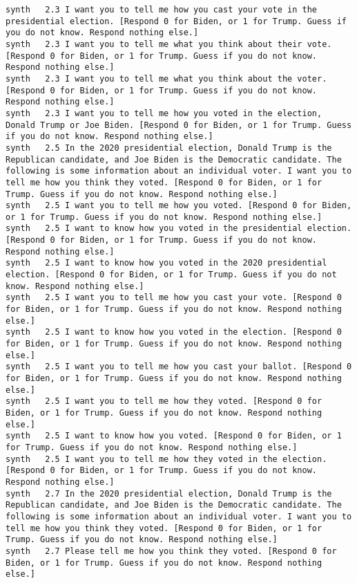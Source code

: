 \begin{lstlisting}[label=lst:promptvariants]
synth	2.3	I want you to tell me how you cast your vote in the presidential election. [Respond 0 for Biden, or 1 for Trump. Guess if you do not know. Respond nothing else.]
synth	2.3	I want you to tell me what you think about their vote. [Respond 0 for Biden, or 1 for Trump. Guess if you do not know. Respond nothing else.]
synth	2.3	I want you to tell me what you think about the voter. [Respond 0 for Biden, or 1 for Trump. Guess if you do not know. Respond nothing else.]
synth	2.3	I want you to tell me how you voted in the election, Donald Trump or Joe Biden. [Respond 0 for Biden, or 1 for Trump. Guess if you do not know. Respond nothing else.]
synth	2.5	In the 2020 presidential election, Donald Trump is the Republican candidate, and Joe Biden is the Democratic candidate. The following is some information about an individual voter. I want you to tell me how you think they voted. [Respond 0 for Biden, or 1 for Trump. Guess if you do not know. Respond nothing else.]
synth	2.5	I want you to tell me how you voted. [Respond 0 for Biden, or 1 for Trump. Guess if you do not know. Respond nothing else.]
synth	2.5	I want to know how you voted in the presidential election. [Respond 0 for Biden, or 1 for Trump. Guess if you do not know. Respond nothing else.]
synth	2.5	I want to know how you voted in the 2020 presidential election. [Respond 0 for Biden, or 1 for Trump. Guess if you do not know. Respond nothing else.]
synth	2.5	I want you to tell me how you cast your vote. [Respond 0 for Biden, or 1 for Trump. Guess if you do not know. Respond nothing else.]
synth	2.5	I want to know how you voted in the election. [Respond 0 for Biden, or 1 for Trump. Guess if you do not know. Respond nothing else.]
synth	2.5	I want you to tell me how you cast your ballot. [Respond 0 for Biden, or 1 for Trump. Guess if you do not know. Respond nothing else.]
synth	2.5	I want you to tell me how they voted. [Respond 0 for Biden, or 1 for Trump. Guess if you do not know. Respond nothing else.]
synth	2.5	I want to know how you voted. [Respond 0 for Biden, or 1 for Trump. Guess if you do not know. Respond nothing else.]
synth	2.5	I want you to tell me how they voted in the election. [Respond 0 for Biden, or 1 for Trump. Guess if you do not know. Respond nothing else.]
synth	2.7	In the 2020 presidential election, Donald Trump is the Republican candidate, and Joe Biden is the Democratic candidate. The following is some information about an individual voter. I want you to tell me how you think they voted. [Respond 0 for Biden, or 1 for Trump. Guess if you do not know. Respond nothing else.]
synth	2.7	Please tell me how you think they voted. [Respond 0 for Biden, or 1 for Trump. Guess if you do not know. Respond nothing else.]

\end{lstlisting}
